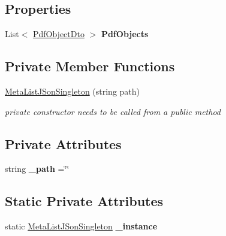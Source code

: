 \subsection*{Properties}
\begin{DoxyCompactItemize}
\item 
\mbox{\label{class_ramboell_1_1i_o_s_1_1_meta_list_j_son_singleton_ae3bdc50a2c96e628e41c00b82a779c63}} 
List$<$ \hyperlink{class_ramboell_1_1i_o_s_1_1_pdf_object_dto}{Pdf\+Object\+Dto} $>$ {\bfseries Pdf\+Objects}
\end{DoxyCompactItemize}
\subsection*{Private Member Functions}
\begin{DoxyCompactItemize}
\item 
\hyperlink{class_ramboell_1_1i_o_s_1_1_meta_list_j_son_singleton_a4c53cce0428da8e4f5be5950e884a8ad}{Meta\+List\+J\+Son\+Singleton} (string path)
\begin{DoxyCompactList}\small\item\em private constructor needs to be called from a public method \end{DoxyCompactList}\end{DoxyCompactItemize}
\subsection*{Private Attributes}
\begin{DoxyCompactItemize}
\item 
\mbox{\label{class_ramboell_1_1i_o_s_1_1_meta_list_j_son_singleton_a4d6f60f45234b616c6588019567b837a}} 
string {\bfseries \+\_\+path} =\char`\"{}\char`\"{}
\end{DoxyCompactItemize}
\subsection*{Static Private Attributes}
\begin{DoxyCompactItemize}
\item 
\mbox{\label{class_ramboell_1_1i_o_s_1_1_meta_list_j_son_singleton_aa5187f1cc93f8405c270e7b19844e5fe}} 
static \hyperlink{class_ramboell_1_1i_o_s_1_1_meta_list_j_son_singleton}{Meta\+List\+J\+Son\+Singleton} {\bfseries \+\_\+instance}
\end{DoxyCompactItemize}


